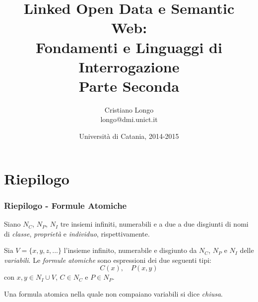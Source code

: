 \documentclass[8pt]{beamer}
\title{Linked Open Data e Semantic Web:\\
Fondamenti e Linguaggi di Interrogazione\\
Parte Seconda}
\author{Cristiano Longo\\ 
{\small{longo@dmi.unict.it}}}
\date{Universit\`a di Catania, 2014-2015}
\begin{document}
\maketitle
\setcounter{tocdepth}{1}

\newcommand{\CNames}{N_C}
\newcommand{\PNames}{N_P}
\newcommand{\INames}{N_I}
\newcommand{\VNames}{V}
\newcommand{\BlankNodes}{\mathcal{B}}
\newcommand{\IRI}{IRI}


\newcommand{\Ont}{\mathcal{O}}
\newcommand{\Ontp}{\mathcal{O'}}

\newcommand{\datatypes}{\mathcal{D}}
\newcommand{\stringLiteral}[1]{\mbox{``#1''}}
\newcommand{\literal}[2]{\mbox{``#1''\textasciicircum\textasciicircum\url{#2}}} %
\newcommand{\literals}{\mathcal{L}}
\newcommand{\Vocab}{\mathcal{V}}


\section{Riepilogo}

\begin{frame}
 \frametitle{Riepilogo - Formule Atomiche}

 Siano $\CNames$, $\PNames$, $\INames$ tre insiemi infiniti, numerabili e 
a due a due disgiunti di nomi di \emph{classe}, \emph{propriet\`a} e \emph{individuo},
rispettivamente.
\vspace{\baselineskip}

Sia $\VNames = \{x, y, z, ... \}$ l'insieme infinito, numerabile 
e disgiunto da $\CNames$, $\PNames$ e $\INames$ delle \emph{variabili}.
Le \emph{formule atomiche} sono espressioni dei due seguenti tipi:
\[
 C(x), \quad P(x, y)
\]
con $x, y \in \INames \cup \VNames$, $C \in \CNames$ e $P \in \PNames$.
\vspace{\baselineskip}

Una formula atomica nella quale non compaiano variabili si dice \emph{chiusa}.
\end{frame}
\end{document}
